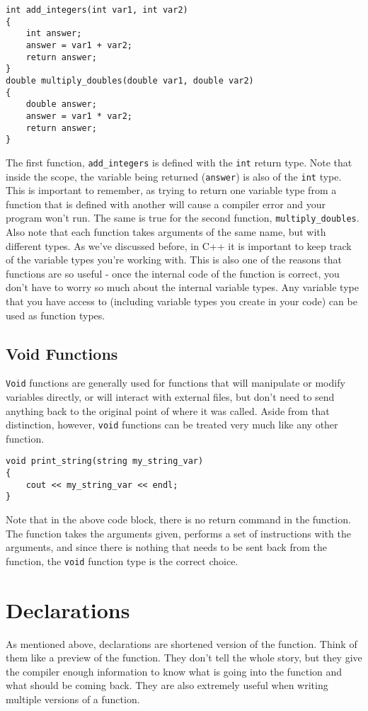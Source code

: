 \begin{verbatim}
int add_integers(int var1, int var2)
{ 
    int answer;
    answer = var1 + var2;
    return answer;
}
double multiply_doubles(double var1, double var2)
{ 
    double answer;
    answer = var1 * var2;
    return answer;
}
\end{verbatim}

The first function, \texttt{add\_integers} is defined with the \texttt{int} return type.  Note that inside the scope, the variable being returned (\texttt{answer}) is also of the \texttt{int} type.  This is important to remember, as trying to return one variable type from a function that is defined with another will cause a compiler error and your program won't run.  The same is true for the second function, \texttt{multiply\_doubles}.  Also note that each function takes arguments of the same name, but with different types.  As we've discussed before, in C++ it is important to keep track of the variable types you're working with.  This is also one of the reasons that functions are so useful - once the internal code of the function is correct, you don't have to worry so much about the internal variable types.  Any variable type that you have access to (including variable types you create in your code) can be used as function types.

\subsection{Void Functions}
\texttt{Void} functions are generally used for functions that will manipulate or modify variables directly, or will interact with external files, but don't need to send anything back to the original point of where it was called.  Aside from that distinction, however, \texttt{void} functions can be treated very much like any other function.

\begin{verbatim}
void print_string(string my_string_var)
{
    cout << my_string_var << endl;
}
\end{verbatim}

Note that in the above code block, there is no return command in the function.  The function takes the arguments given, performs a set of instructions with the arguments, and since there is nothing that needs to be sent back from the function, the \texttt{void} function type is the correct choice.

\section{Declarations}
As mentioned above, declarations are shortened version of the function.  Think of them like a preview of the function.  They don't tell the whole story, but they give the compiler enough information to know what is going into the function and what should be coming back.  They are also extremely useful when writing multiple versions of a function.

